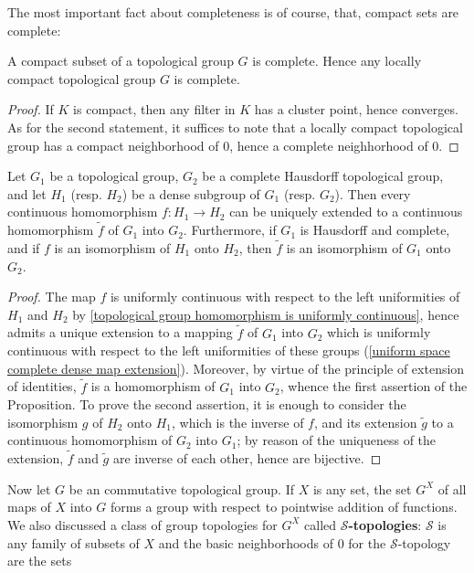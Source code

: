 The most important fact about completeness is of course, that, compact sets are complete:
\begin{proposition}\label{topological group compact is complete}
A compact subset of a topological group $G$ is complete. Hence any locally compact topological group $G$ is complete.
\end{proposition}
\begin{proof}
If $K$ is compact, then any filter in $K$ has a cluster point, hence converges. As for the second statement, it suffices to note that a locally compact topological group has a compact neighborhood of $0$, hence a complete neighhorhood of $0$.
\end{proof}
\begin{proposition}\label{topological group complete Hausdorff into extension}
Let $G_1$ be a topological group, $G_2$ be a complete Hausdorff topological group, and let $H_1$ (resp. $H_2$) be a dense subgroup of $G_1$ (resp. $G_2$). Then every continuous homomorphism $f:H_1\to H_2$ can be uniquely extended to a continuous homomorphism $\tilde{f}$ of $G_1$ into $G_2$. Furthermore, if $G_1$ is Hausdorff and complete, and if $f$ is an isomorphism of $H_1$ onto $H_2$, then $\tilde{f}$ is an isomorphism of $G_1$ onto $G_2$.
\end{proposition}
\begin{proof}
The map $f$ is uniformly continuous with respect to the left uniformities of $H_1$ and $H_2$ by \cref{topological group homomorphism is uniformly continuous}, hence admits a unique extension to a mapping $\tilde{f}$ of $G_1$ into $G_2$ which is uniformly continuous with respect to the left uniformities of these groups (\cref{uniform space complete dense map extension}). Moreover, by virtue of the principle of extension of identities, $\tilde{f}$ is a homomorphism of $G_1$ into $G_2$, whence the first assertion of the Proposition. To prove the second assertion, it is enough to consider the isomorphism $g$ of $H_2$ onto $H_1$, which is the inverse of $f$, and its extension $\tilde{g}$ to a continuous homomorphism of $G_2$ into $G_1$; by reason of the uniqueness of the extension, $\tilde{f}$ and $\tilde{g}$ are inverse of each other, hence are bijective.
\end{proof}
Now let $G$ be an commutative topological group. If $X$ is any set, the set $G^X$ of all maps of $X$ into $G$ forms a group with respect to pointwise addition of functions. We also discussed a class of group topologies for $G^X$ called \textbf{$\mathcal{S}$-topologies}: $\mathcal{S}$ is any family of subsets of $X$ and the basic neighborhoods of $0$ for the $\mathcal{S}$-topology are the sets
